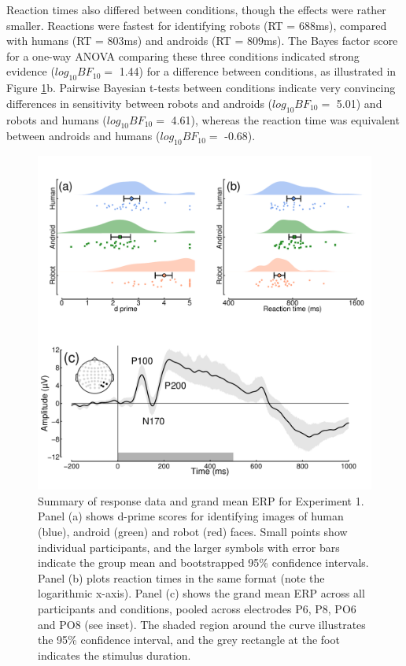 \documentclass[
]{article}
\begin{document}
Reaction times also differed between conditions, though the effects were rather smaller. Reactions were fastest for identifying robots (RT = 688ms), compared with humans (RT = 803ms) and androids (RT = 809ms). The Bayes factor score for a one-way ANOVA comparing these three conditions indicated strong evidence (\(log_{10}BF_{10} =\) 1.44) for a difference between conditions, as illustrated in Figure \ref{fig:RobotsData}b. Pairwise Bayesian t-tests between conditions indicate very convincing differences in sensitivity between robots and androids (\(log_{10}BF_{10} =\) 5.01) and robots and humans (\(log_{10}BF_{10} =\) 4.61), whereas the reaction time was equivalent between androids and humans (\(log_{10}BF_{10} =\) -0.68).

\begin{figure}

{\centering \includegraphics{Figures/RobotsData} 

}

\caption{Summary of response data and grand mean ERP for Experiment 1. Panel (a) shows d-prime scores for identifying images of human (blue), android (green) and robot (red) faces. Small points show individual participants, and the larger symbols with error bars indicate the group mean and bootstrapped 95\% confidence intervals. Panel (b) plots reaction times in the same format (note the logarithmic x-axis). Panel (c) shows the grand mean ERP across all participants and conditions, pooled across electrodes P6, P8, PO6 and PO8 (see inset). The shaded region around the curve illustrates the 95\% confidence interval, and the grey rectangle at the foot indicates the stimulus duration.}\label{fig:RobotsData}
\end{figure}
\end{document}
